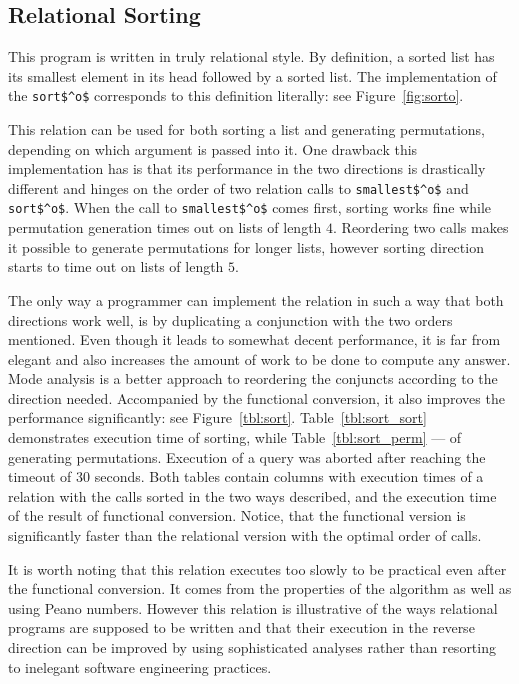 \subsection{Relational Sorting}



This program is written in truly relational style.
By definition, a sorted list has its smallest element in its head followed by a sorted list.
The implementation of the \lstinline{sort$^o$} corresponds to this definition literally: see Figure~\ref{fig:sorto}.

This relation can be used for both sorting a list and generating permutations, depending on which argument is passed into it.
One drawback this implementation has is that its performance in the two directions is drastically different and hinges on the order of two relation calls to \lstinline{smallest$^o$} and \lstinline{sort$^o$}.
When the call to \lstinline{smallest$^o$} comes first, sorting works fine while permutation generation times out on lists of length $4$.
Reordering two calls makes it possible to generate permutations for longer lists, however sorting direction starts to time out on lists of length $5$.

The only way a programmer can implement the relation in such a way that both directions work well, is by duplicating a conjunction with the two orders mentioned.
Even though it leads to somewhat decent performance, it is far from elegant and also increases the amount of work to be done to compute any answer.
Mode analysis is a better approach to reordering the conjuncts according to the direction needed.
Accompanied by the functional conversion, it also improves the performance significantly: see Figure~\ref{tbl:sort}.
Table~\ref{tbl:sort_sort} demonstrates execution time of sorting, while Table~\ref{tbl:sort_perm} --- of generating permutations.
Execution of a query was aborted after reaching the timeout of 30 seconds.
Both tables contain columns with execution times of a relation with the calls sorted in the two ways described, and the execution time of the result of functional conversion.
Notice, that the functional version is significantly faster than the relational version with the optimal order of calls.



It is worth noting that this relation executes too slowly to be practical even after the functional conversion.
It comes from the properties of the algorithm as well as using Peano numbers.
However this relation is illustrative of the ways relational programs are supposed to be written and that their execution in the reverse direction can be improved by using sophisticated analyses rather than resorting to inelegant software engineering practices.


